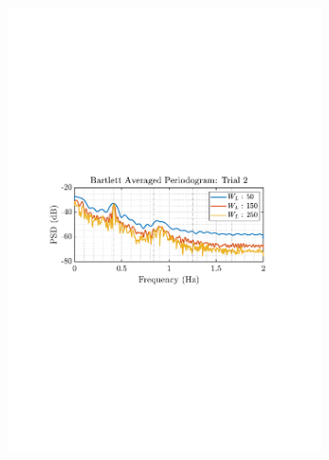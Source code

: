 \documentclass[12pt]{article}
\begin{document}
\begin{figure}[H]
\begin{subfigure}{0.49\textwidth}
			\includegraphics[trim={2.2cm 11cm 3.15cm  11.2cm}, clip, width=\textwidth]{../MATLAB/figures/q1_5a_fig05.pdf} 
		\end{subfigure}
		\begin{subfigure}{0.49\textwidth}
			\centering

\end{subfigure}
\end{figure}
\end{document}
